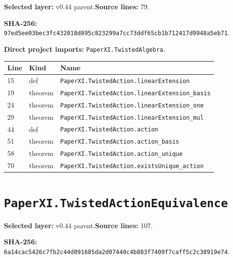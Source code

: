 \documentclass[10pt,oneside]{book}
\begin{document}
\textbf{Selected layer:} v0.44 parent.\quad\textbf{Source lines:} 79.\par\textbf{SHA-256:} {\scriptsize\nolinkurl{97ed5ee03bec3fc432018d895c823299a7cc73ddf65cb1b712417d9948a5eb71}}.


\textbf{Direct project imports:} \nolinkurl{PaperXI.TwistedAlgebra}.

\begin{longtable}{@{}p{}p{}p{}@{}}\toprule Line&Kind&Name\\\midrule\endhead

15&def&\nolinkurl{PaperXI.TwistedAction.linearExtension}\\

19&theorem&\nolinkurl{PaperXI.TwistedAction.linearExtension_basis}\\

24&theorem&\nolinkurl{PaperXI.TwistedAction.linearExtension_one}\\

29&theorem&\nolinkurl{PaperXI.TwistedAction.linearExtension_mul}\\

44&def&\nolinkurl{PaperXI.TwistedAction.action}\\

51&theorem&\nolinkurl{PaperXI.TwistedAction.action_basis}\\

58&theorem&\nolinkurl{PaperXI.TwistedAction.action_unique}\\

70&theorem&\nolinkurl{PaperXI.TwistedAction.existsUnique_action}\\

\bottomrule\end{longtable}

\section{\texorpdfstring{\nolinkurl{PaperXI.TwistedActionEquivalence}}{PaperXI.TwistedActionEquivalence}}\label{module:PaperXI.TwistedActionEquivalence}

\textbf{Selected layer:} v0.44 parent.\quad\textbf{Source lines:} 107.\par\textbf{SHA-256:} {\scriptsize\nolinkurl{6a14cac5426c7fb2c44d091685da2d07440c4b883f7409f7caff5c2c38919e74}}.
\end{document}
